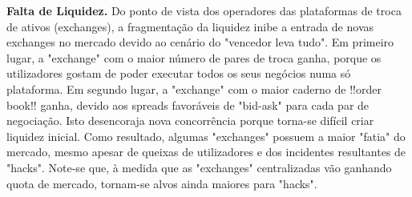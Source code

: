 \documentclass[UTF8,nofonts]{article}
\begin{document}
\begin{multicols}{2}
\textbf{Falta de Liquidez.} Do ponto de vista dos operadores das plataformas de troca de ativos (exchanges), a fragmentação da liquidez inibe a entrada de novas exchanges no mercado devido ao cenário do "vencedor leva tudo". Em primeiro lugar, a "exchange" com o maior número de pares de troca ganha, porque os utilizadores gostam de poder executar todos os seus negócios numa só plataforma. Em segundo lugar, a "exchange" com o maior caderno de !!order book!! ganha, devido aos spreads favoráveis de "bid-ask" para cada par de negociação. Isto desencoraja nova concorrência porque torna-se difícil criar liquidez inicial. Como resultado, algumas "exchanges" possuem a maior "fatia" do mercado, mesmo apesar de queixas de utilizadores e dos incidentes resultantes de "hacks". Note-se que, à medida que as "exchanges" centralizadas vão ganhando quota de mercado, tornam-se alvos ainda maiores para "hacks".


\end{multicols}
\end{document}

